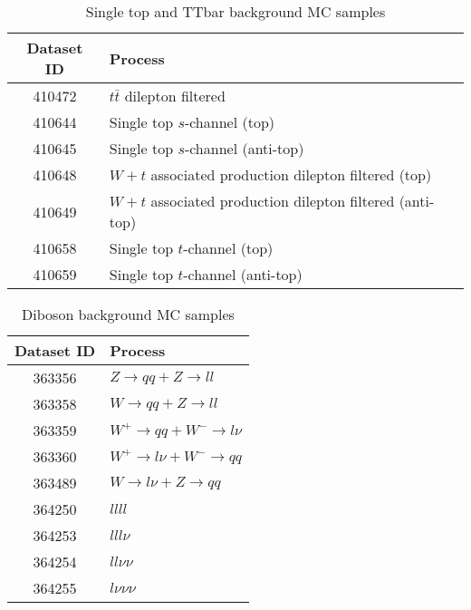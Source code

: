 \documentclass[14pt, a4paper]{book}
\begin{document}
\begin{table}[!h]
    \centering
    \caption{Single top and TTbar background MC samples}
    \begin{tabular}{c|l}\midrule\midrule
        Dataset ID              & Process\\\midrule
        410472                  & $t\bar{t}$ dilepton filtered\\
        410644                  & Single top $s$-channel (top)\\
        410645                  & Single top $s$-channel (anti-top)\\
        410648                  & $W+t$ associated production dilepton filtered (top)\\
        410649                  & $W+t$ associated production dilepton filtered (anti-top)\\
        410658                  & Single top $t$-channel (top)\\
        410659                  & Single top $t$-channel (anti-top)\\\midrule\midrule
    \end{tabular}
    \label{tab:top_DSID}
\end{table}

\begin{table}[!h]
    \centering
    \caption{Diboson background MC samples}
    \begin{tabular}{c|l}\midrule\midrule
        Dataset ID              & Process\\\midrule
        363356                  & $Z\rightarrow qq + Z\rightarrow ll$\\
        363358                  & $W\rightarrow qq + Z\rightarrow ll$\\
        363359                  & $W^+\rightarrow qq + W^-\rightarrow l\nu$\\
        363360                  & $W^+\rightarrow l\nu+W^-\rightarrow qq$\\
        363489                  & $W\rightarrow l\nu + Z\rightarrow qq$\\
        364250                  & $llll$\\
        364253                  & $lll\nu$\\
        364254                  & $ll\nu\nu$\\
        364255                  & $l\nu\nu\nu$\\\midrule\midrule
    \end{tabular}
    \label{tab:Diboson_DSID}
\end{table}
\end{document}
